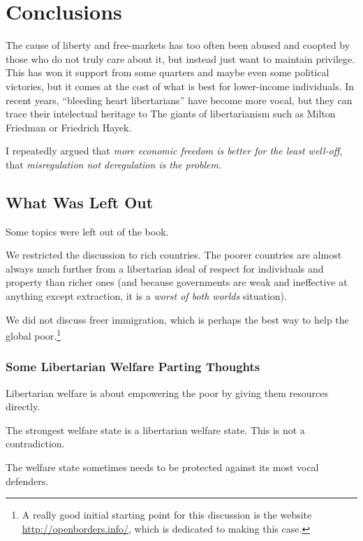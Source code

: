 \chapter{Conclusions}

The cause of liberty and free-markets has too often been abused and coopted by
those who do not truly care about it, but instead just want to maintain
privilege. This has won it support from some quarters and maybe even some
political victories, but it comes at the cost of what is best for lower-income
individuals. In recent years, ``bleeding heart libertarians'' have become more
vocal, but they can trace their intelectual heritage to The giants of
libertarianism such as Milton Friedman or Friedrich Hayek.

I repeatedly argued that \emph{more economic freedom is better for the least
well-off}, that \emph{misregulation not deregulation is the problem}.

\section{What Was Left Out}

Some topics were left out of the book.

We restricted the discussion to rich countries. The poorer countries are almost
always much further from a libertarian ideal of respect for individuals and
property than richer ones (and because governments are weak and ineffective at
anything except extraction, it is a \emph{worst of both worlds} situation).

We did not discuss freer immigration, which is perhaps the best way to help the
global poor.\footnote{A really good initial starting point for this discussion
is the website \url{http://openborders.info/}, which is dedicated to making
this case.}

\subsection{Some Libertarian Welfare Parting Thoughts}

\thought Libertarian welfare is about empowering the poor by giving them
resources directly.

\thought The strongest welfare state is a libertarian welfare state. This is
not a contradiction.

\thought The welfare state sometimes needs to be protected against its most
vocal defenders.

